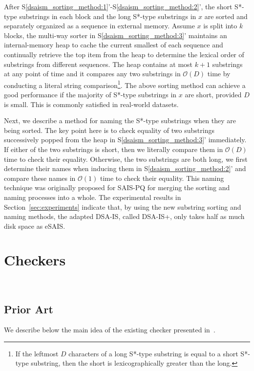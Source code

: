 \documentclass[10pt,journal,compsoc]{IEEEtran}
\begin{document}
After S\ref{dsaism_sorting_method:1}'-S\ref{dsaism_sorting_method:2}', the short S*-type substrings in each block and the long S*-type substrings in $x$ are sorted and separately organized as a sequence in external memory. Assume $x$ is split into $k$ blocks, the multi-way sorter in S\ref{dsaism_sorting_method:3}' maintains an internal-memory heap to cache the current smallest of each sequence and continually retrieve the top item from the heap to determine the lexical order of substrings from different sequences. The heap contains at most $k + 1$ substrings at any point of time and it compares any two substrings in $\mathcal{O}(D)$ time by conducting a literal string comparison\footnote{If the leftmost $D$ characters of a long S*-type substring is equal to a short S*-type substring, then the short is lexicographically greater than the long.}. The above sorting method can achieve a good performance if the majority of S*-type substrings in $x$ are short, provided $D$ is small. This is commonly satisfied in real-world datasets.

Next, we describe a method for naming the S*-type substrings when they are being sorted. The key point here is to check equality of two substrings successively popped from the heap in S\ref{dsaism_sorting_method:3}' immediately. If either of the two substrings is short, then we literally compare them in $\mathcal{O}(D)$ time to check their equality. Otherwise, the two substrings are both long, we first determine their names when inducing them in S\ref{dsaism_sorting_method:2}' and compare these names in $\mathcal{O}(1)$ time to check their equality. This naming technique was originally proposed for SAIS-PQ for merging the sorting and naming processes into a whole. The experimental results in Section~\ref{sec:experiments} indicate that, by using the new substring sorting and naming methods, the adapted DSA-IS, called DSA-IS+, only takes half as much disk space as eSAIS.

\section{Checkers}~\label{sec:checkers}

\subsection{Prior Art} \label{sec:checkers:prior_art}

We describe below the main idea of the existing checker presented in~\cite{Dementiev2008a}.
\end{document}
